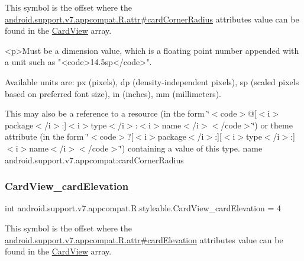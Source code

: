 This symbol is the offset where the \hyperlink{classandroid_1_1support_1_1v7_1_1appcompat_1_1R_1_1attr_a99165bfd49949d6d8a5a78d2f2b26956}{android.\+support.\+v7.\+appcompat.\+R.\+attr\#card\+Corner\+Radius} attribute\textquotesingle{}s value can be found in the \hyperlink{classandroid_1_1support_1_1v7_1_1appcompat_1_1R_1_1styleable_aee2dd81febffbeeaeff51a35af0f87ec}{Card\+View} array.

\begin{DoxyVerb}      <p>Must be a dimension value, which is a floating point number appended with a unit such as "<code>14.5sp</code>".
\end{DoxyVerb}
 Available units are\+: px (pixels), dp (density-\/independent pixels), sp (scaled pixels based on preferred font size), in (inches), mm (millimeters). 

This may also be a reference to a resource (in the form \char`\"{}$<$code$>$@\mbox{[}$<$i$>$package$<$/i$>$\+:\mbox{]}$<$i$>$type$<$/i$>$\+:$<$i$>$name$<$/i$>$$<$/code$>$\char`\"{}) or theme attribute (in the form \char`\"{}$<$code$>$?\mbox{[}$<$i$>$package$<$/i$>$\+:\mbox{]}\mbox{[}$<$i$>$type$<$/i$>$\+:\mbox{]}$<$i$>$name$<$/i$>$$<$/code$>$\char`\"{}) containing a value of this type.  name android.\+support.\+v7.\+appcompat\+:card\+Corner\+Radius \mbox{\label{classandroid_1_1support_1_1v7_1_1appcompat_1_1R_1_1styleable_ae06791ca725d44a4ad44afc35ef9fd36}} 
\subsubsection{\texorpdfstring{Card\+View\+\_\+card\+Elevation}{CardView\_cardElevation}}
{\footnotesize\ttfamily int android.\+support.\+v7.\+appcompat.\+R.\+styleable.\+Card\+View\+\_\+card\+Elevation = 4\hspace{0.3cm}{\ttfamily [static]}}

This symbol is the offset where the \hyperlink{classandroid_1_1support_1_1v7_1_1appcompat_1_1R_1_1attr_a2ab5dc49d1af3f3feb3a8a8a1c587ae0}{android.\+support.\+v7.\+appcompat.\+R.\+attr\#card\+Elevation} attribute\textquotesingle{}s value can be found in the \hyperlink{classandroid_1_1support_1_1v7_1_1appcompat_1_1R_1_1styleable_aee2dd81febffbeeaeff51a35af0f87ec}{Card\+View} array.

